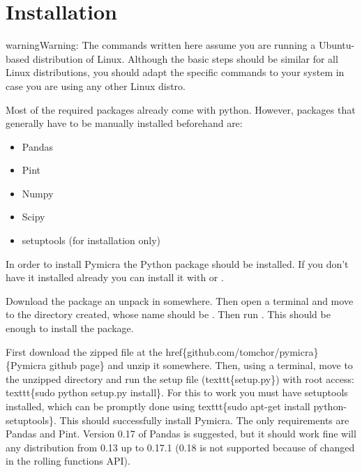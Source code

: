 \documentclass[a4paper,10pt,english]{sphinxmanual}
\begin{document}
\section{Installation}
\label{install:installation}\label{install::doc}
\begin{notice}{warning}{Warning:}
The commands written here assume you are running a Ubuntu-based distribution of
Linux. Although the basic steps should be similar for all Linux distributions, you
should adapt the specific commands to your system in case you are using any other Linux distro.
\end{notice}

Most of the required packages already come with python. However, packages that
generally have to be manually installed beforehand are:
\begin{itemize}
\item {} 
Pandas

\item {} 
Pint

\item {} 
Numpy

\item {} 
Scipy

\item {} 
setuptools (for installation only)

\end{itemize}

In order to install Pymicra the  Python package should be
installed. If you don't have it installed already you can install it with
 or .

Download the package an unpack in somewhere. Then open a terminal and
move to the directory created, whose name should be . Then
run . This should be enough to install
the package.

First download the zipped file at the href\{github.com/tomchor/pymicra\}\{Pymicra
github page\} and unzip it somewhere. Then, using a
terminal, move to the unzipped directory and run the setup file
(texttt\{setup.py\}) with
root access: texttt\{sudo python setup.py install\}. For this to work you must
have setuptools installed, which can be promptly done using texttt\{sudo apt-get
install python-setuptools\}. This should successfully install Pymicra. The only
requirements are Pandas and Pint. Version 0.17 of Pandas is suggested, but it
should work fine will any distribution from 0.13 up to 0.17.1 (0.18 is not
supported because of changed in the rolling functions API).
\end{document}
